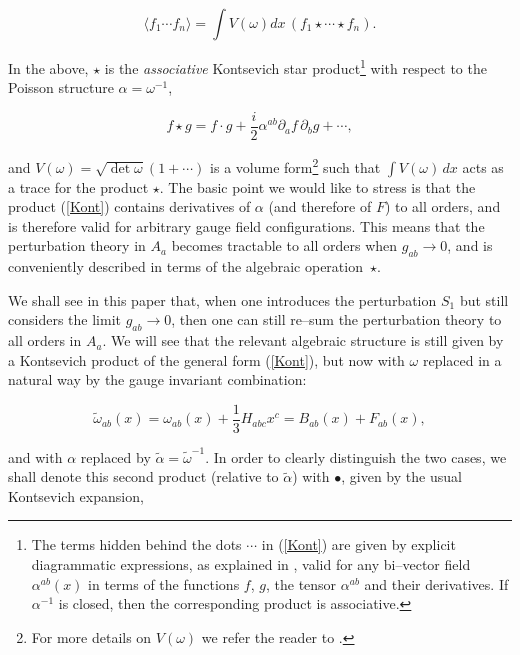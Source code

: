 \documentclass[a4paper,11pt]{article}
\begin{document}
\begin{equation}
\langle f_{1} \cdots f_{n} \rangle = \int V\left( \omega \right) dx\, 
\left( f_{1} \star \cdots \star f_{n}\right) .
\label{nptfct}
\end{equation}

\noindent
In the above, $\star$ is the \textit{associative} Kontsevich star 
product\footnote{The terms hidden behind the dots $\cdots$ in (\ref{Kont}) are 
given by explicit diagrammatic expressions, as explained in \cite{Kontsevich}, 
valid for any bi--vector field $\alpha^{ab} \left( x\right)$ in terms of the 
functions $f$, $g$, the tensor $\alpha^{ab}$ and their derivatives. If 
$\alpha^{-1}$ is closed, then the corresponding product is associative.} 
with respect to the Poisson structure $\alpha = \omega^{-1}$,

\begin{equation}
f\star g=f\cdot g+\frac{i}{2}\alpha ^{ab}\partial _{a}f\,\partial
_{b}g+\cdots ,  \label{Kont}
\end{equation}

\noindent
and $V\left( \omega \right) = \sqrt{\det \omega} \left( 1 + 
\cdots \right)$ is a volume form\footnote{For more details on $V\left( 
\omega \right) $ we refer the reader to \cite{Cornalba-3}.} such that 
$\int V\left( \omega \right)\, dx$ acts as a trace for the product 
$\star$. The basic point we would like to stress is that the product 
(\ref{Kont}) contains derivatives of $\alpha$ (and therefore of $F$) 
to all orders, and is therefore valid for arbitrary gauge field 
configurations. This means that the perturbation theory in $A_{a}$ becomes 
tractable to all orders when $g_{ab} \to 0$, and is conveniently 
described in terms of the algebraic operation~$\star$.

We shall see in this paper that, when one introduces the perturbation 
$S_{1}$ but still considers the limit $g_{ab}\rightarrow 0$, then one can still
re--sum the perturbation theory to all orders in $A_{a}$. We will see that the
relevant algebraic structure is still given by a Kontsevich product of the
general form (\ref{Kont}), but now with $\omega$ replaced in a natural
way by the gauge invariant combination:

$$
\widetilde{\omega}_{ab}\left( x\right) = \omega_{ab}\left( x\right) + 
\frac{1}{3}H_{abc}x^{c} = B_{ab}\left( x\right) + F_{ab}\left( 
x\right) ,
$$

\noindent
and with $\alpha$ replaced by $\widetilde{\alpha} =
\widetilde{\omega}^{-1}$.  In order to clearly distinguish the two cases,
we shall denote this second product (relative to $\widetilde{\alpha}$) with
$\bullet$, given by the usual Kontsevich expansion,
\end{document}

